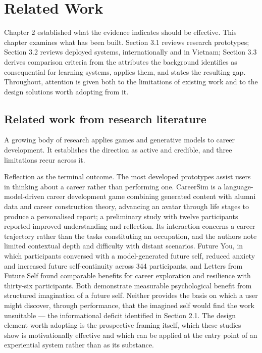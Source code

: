 \newpage
\section{Related Work}

Chapter 2 established what the evidence indicates should be effective. This chapter examines what has been built. Section 3.1 reviews research prototypes; Section 3.2 reviews deployed systems, internationally and in Vietnam; Section 3.3 derives comparison criteria from the attributes the background identifies as consequential for learning systems, applies them, and states the resulting gap. Throughout, attention is given both to the limitations of existing work and to the design solutions worth adopting from it.

\subsection{Related work from research literature}

A growing body of research applies games and generative models to career development. It establishes the direction as active and credible, and three limitations recur across it.

Reflection as the terminal outcome. The most developed prototypes assist users in thinking about a career rather than performing one. CareerSim\cite{r76} is a language-model-driven career development game combining generated content with alumni data and career construction theory, advancing an avatar through life stages to produce a personalised report; a preliminary study with twelve participants reported improved understanding and reflection. Its interaction concerns a career trajectory rather than the tasks constituting an occupation, and the authors note limited contextual depth and difficulty with distant scenarios. Future You\cite{r77}, in which participants conversed with a model-generated future self, reduced anxiety and increased future self-continuity across 344 participants, and Letters from Future Self\cite{r78} found comparable benefits for career exploration and resilience with thirty-six participants. Both demonstrate measurable psychological benefit from structured imagination of a future self. Neither provides the basis on which a user might discover, through performance, that the imagined self would find the work unsuitable --- the informational deficit identified in Section 2.1. The design element worth adopting is the prospective framing itself, which these studies show is motivationally effective and which can be applied at the entry point of an experiential system rather than as its substance.

